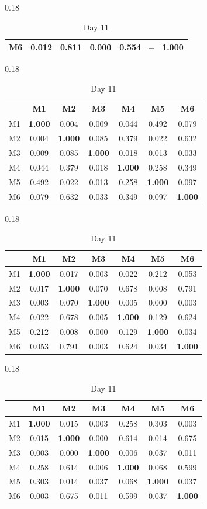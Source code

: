 \begin{table}[htbp]
\begin{subtable}[t]{0.18\linewidth}
\begin{tabular}{ccccccc}
M6 & 0.012 & 0.811 & 0.000 & 0.554 & -- & \textbf{1.000} \\
\bottomrule
\end{tabular}
\end{subtable}
\hfill
\begin{subtable}[t]{0.18\linewidth}
\centering
\caption*{Day 9}
\begin{tabular}{ccccccc}
\toprule
& M1 & M2 & M3 & M4 & M5 & M6 \\
\midrule
M1 & \textbf{1.000} & 0.004 & 0.009 & 0.044 & 0.492 & 0.079 \\
M2 & 0.004 & \textbf{1.000} & 0.085 & 0.379 & 0.022 & 0.632 \\
M3 & 0.009 & 0.085 & \textbf{1.000} & 0.018 & 0.013 & 0.033 \\
M4 & 0.044 & 0.379 & 0.018 & \textbf{1.000} & 0.258 & 0.349 \\
M5 & 0.492 & 0.022 & 0.013 & 0.258 & \textbf{1.000} & 0.097 \\
M6 & 0.079 & 0.632 & 0.033 & 0.349 & 0.097 & \textbf{1.000} \\
\bottomrule
\end{tabular}
\end{subtable}
\hfill
\begin{subtable}[t]{0.18\linewidth}
\centering
\caption*{Day 10}
\begin{tabular}{ccccccc}
\toprule
& M1 & M2 & M3 & M4 & M5 & M6 \\
\midrule
M1 & \textbf{1.000} & 0.017 & 0.003 & 0.022 & 0.212 & 0.053 \\
M2 & 0.017 & \textbf{1.000} & 0.070 & 0.678 & 0.008 & 0.791 \\
M3 & 0.003 & 0.070 & \textbf{1.000} & 0.005 & 0.000 & 0.003 \\
M4 & 0.022 & 0.678 & 0.005 & \textbf{1.000} & 0.129 & 0.624 \\
M5 & 0.212 & 0.008 & 0.000 & 0.129 & \textbf{1.000} & 0.034 \\
M6 & 0.053 & 0.791 & 0.003 & 0.624 & 0.034 & \textbf{1.000} \\
\bottomrule
\end{tabular}
\end{subtable}
\hfill
\begin{subtable}[t]{0.18\linewidth}
\centering
\caption*{Day 11}
\begin{tabular}{ccccccc}
\toprule
& M1 & M2 & M3 & M4 & M5 & M6 \\
\midrule
M1 & \textbf{1.000} & 0.015 & 0.003 & 0.258 & 0.303 & 0.003 \\
M2 & 0.015 & \textbf{1.000} & 0.000 & 0.614 & 0.014 & 0.675 \\
M3 & 0.003 & 0.000 & \textbf{1.000} & 0.006 & 0.037 & 0.011 \\
M4 & 0.258 & 0.614 & 0.006 & \textbf{1.000} & 0.068 & 0.599 \\
M5 & 0.303 & 0.014 & 0.037 & 0.068 & \textbf{1.000} & 0.037 \\
M6 & 0.003 & 0.675 & 0.011 & 0.599 & 0.037 & \textbf{1.000} \\
\bottomrule
\end{tabular}
\end{subtable}
\hfill
\end{table}